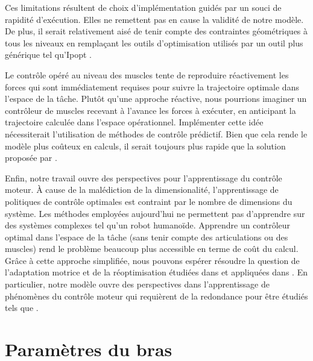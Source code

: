 \documentclass[pdftex,a4paper,11pt]{article}
\begin{document}
Ces limitations résultent de choix d'implémentation guidés par un souci de
rapidité d'exécution.  Elles ne remettent pas en cause la validité de notre
modèle.  De plus, il serait relativement aisé de tenir compte des contraintes
géométriques à tous les niveaux en remplaçant les outils d'optimisation
utilisés par un outil plus générique tel qu'Ipopt \cite{ipopt}.

Le contrôle opéré au niveau des muscles tente de reproduire réactivement les forces
qui sont immédiatement requises pour suivre la trajectoire optimale dans l'espace de la tâche.
Plutôt qu'une approche réactive, nous pourrions imaginer un contrôleur de
muscles recevant à l'avance les forces à exécuter, en anticipant la trajectoire
calculée dans l'espace opérationnel.
Implémenter cette idée nécessiterait l'utilisation de méthodes de contrôle prédictif.
Bien que cela rende le modèle plus coûteux en calculs, il serait toujours plus rapide
que la solution proposée par \cite{rigoux11}.

Enfin, notre travail ouvre des perspectives pour l'apprentissage du con\-trô\-le moteur.
À cause de la \og{}malédiction de la dimensionalité\fg{}, l'apprentissage de
politiques de contrôle optimales est contraint par
le nombre de dimensions du système. Les méthodes employées aujourd'hui ne permettent
pas d'apprendre sur des systèmes complexes tel qu'un robot humanoïde.
Apprendre un contrôleur optimal dans l'espace de la tâche (sans tenir compte
des articulations ou des muscles) rend le problème beaucoup plus accessible
en terme de coût du calcul.
Grâce à cette approche simplifiée, nous pouvons espérer résoudre la question de l'adaptation motrice et de la
réoptimisation étudiées dans \cite{izawa08} et appliquées dans \cite{marin11_gecco}.
En particulier, notre modèle ouvre des perspectives dans l'apprentissage
de phénomènes du contrôle moteur qui requièrent de la redondance pour être étudiés
tels que \cite{diedrichsen10}.



\newpage

\appendix

\section{Paramètres du bras}
\label{app:arm}
\end{document}
